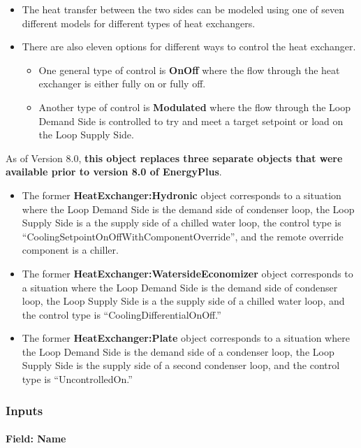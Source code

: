 \begin{itemize}
\item
    The heat transfer between the two sides can be modeled using one of seven different models for different types of heat exchangers.
\item
    There are also eleven options for different ways to control the heat exchanger.
    \begin{itemize}
        \item
            One general type of control is \textbf{OnOff} where the flow through the heat exchanger is either fully on or fully off.
        \item
            Another type of control is \textbf{Modulated} where the flow through the Loop Demand Side is controlled to try and meet a target setpoint or load on the Loop Supply Side.
    \end{itemize}
\end{itemize}

As of Version 8.0, \textbf{this object replaces three separate objects that were available prior to version 8.0 of EnergyPlus}.
\begin{itemize}
\item
    The former \textbf{HeatExchanger:Hydronic} object corresponds to a situation where the Loop Demand Side is the demand side of condenser loop,
    the Loop Supply Side is a the supply side of a chilled water loop, the control type is ``CoolingSetpointOnOffWithComponentOverride'',
    and the remote override component is a chiller.
\item
    The former \textbf{HeatExchanger:WatersideEconomizer} object corresponds to a situation where the Loop Demand Side is the demand side of condenser loop,
    the Loop Supply Side is a the supply side of a chilled water loop, and the control type is ``CoolingDifferentialOnOff.''
\item
    The former \textbf{HeatExchanger:Plate} object corresponds to a situation where the Loop Demand Side is the demand side of a condenser loop,
    the Loop Supply Side is the supply side of a second condenser loop, and the control type is ``UncontrolledOn.''
\end{itemize}

\subsubsection{Inputs}\label{inputs-15-002}

\paragraph{Field: Name}\label{field-name-13-001}

